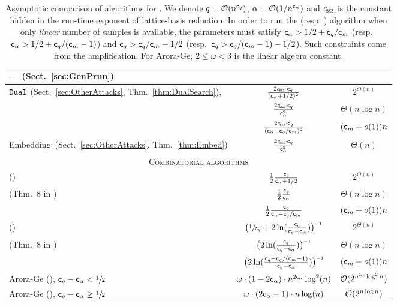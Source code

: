 \begin{table}[h]
\begin{center}
\begin{tabular}{|p{6.3cm} |c | c |}
			-- \GenPrun~(Sect.~\ref{sec:GenPrun}) & & \\ \hline 
			\multirow{3}{*}{$\texttt{Dual}$ (Sect.~\ref{sec:OtherAttacks}, Thm.~\ref{thm:DualSearch}), \cite{DCC:HKM}} & $\frac{2 \cBKZ \cdot \cq}{ (\ca +1/2)^2 } $ &  $2^{\Theta(n)}$  \\[1pt] \cline{2-3}
			& $\frac{2 \cBKZ \cdot \cq}{\vphantom{\scalebox{1.2}x^2} \ca^2}  $  & $\Theta (n \log n)$ \\ \cline{2-3}
			& $\frac{2 \cBKZ \cdot \cq}{\vphantom{\scalebox{1.2}x^2} (\ca-\cq/\cm)^2}  $  & $(\mathsf{c}_m+o(1))n$ \\ \hline
			Embedding~(Sect.~\ref{sec:OtherAttacks}, Thm.~\ref{thm:Embed}) &  $ \frac{2 \cBKZ \cdot \cq}{\vphantom{\scalebox{1.2}x^2} \ca^2} $ & $\Theta(n)$ \\[2pt] \hline
			\multicolumn{3}{|c|}{\textsc{ Combinatorial algorithms}}\\ \hline
			\BKW  (\cite{DCC:ACFFP15}) & $\frac{1}{2} \frac{\mathsf{c}_q}{\mathsf{c}_{\alpha}+1/2} $ & $2^{\Theta(n)}$ \\ \hline
			\multirow{2}{*}{\BKW (Thm.\ 8 in \cite{DCC:HKM})} & $\frac{1}{2} \frac{\mathsf{c}_q}{ \mathsf{c}_{\alpha}} $ & $\Theta(n \log n)$ \\ \cline{2-3}
			& $\frac{1}{2} \frac{\mathsf{c}_q}{ \mathsf{c}_{\alpha}-\mathsf{c}_q/\mathsf{c}_m} $ & $(\mathsf{c}_m+o(1)) n$ \\ \hline	
			\BKWKF (\cite{C:GuoJohSta15, C:KirFou15}) & $ \bigl(\sfrac{1}{\mathsf{c}_q} + 2\ln(\tfrac{\mathsf{c}_q}{\mathsf{c}_q-\mathsf{c}_{\alpha}})\bigr)^{\scriptscriptstyle -1} $ & $2^{\Theta(n)}$ \\ \hline
			\multirow{2}{*}{\BKWKF (Thm.\ 8 in \cite{DCC:HKM})} & $ \bigl(2\ln(\tfrac{\mathsf{c}_q}{\mathsf{c}_q-\mathsf{c}_{\alpha}})\bigr)^{\scriptscriptstyle -1} $ & ${\Theta(n\log n)}$ \\ \cline{2-3}
			& $ \bigl(2\ln(\tfrac{\mathsf{c}_q-\mathsf{c}_q/(\mathsf{c}_m-1)}{\mathsf{c}_q-\mathsf{c}_{\alpha}})\bigr)^{\scriptscriptstyle -1} $ & $(\mathsf{c}_m+o(1)) n$ \\
			 \thickline
			Arora-Ge (\cite{APS15, ICALP:AroGe11}), $\mathsf{c}_q-\mathsf{c}_{\alpha} < \sfrac12$ & \scriptsize{$ \omega \cdot (1-2\mathsf{c}_{\alpha}) \cdot  n^{2 \mathsf{c}_{\alpha}} \log^2(n)$} & $\mathcal{O}(2^{n^{\mathsf{c}_{\alpha}} \log^2 n})$ \\ \hline
			Arora-Ge (\cite{APS15, ICALP:AroGe11}), $\mathsf{c}_q-\mathsf{c}_{\alpha} \geq \sfrac12$ & \scriptsize{$\omega \cdot (2 \mathsf{c}_{\alpha}-1) \cdot n \log(n)$} & $\mathcal{O}(2^{n \log n})$ \\ \hline
		\end{tabular} 
	\end{center}
	\caption[\LWE attacks: asymptotics]{Asymptotic comparison of algorithms for \LWE. We denote $q = \mathcal{O}(n^{\mathsf{c}_q})$, $\alpha =  \mathcal{O}(1/n^{\mathsf{c}_{\alpha}})$ and $\cBKZ$ is the constant hidden in the run-time exponent of lattice-basis reduction. 
	In order to run the \BKW (resp. ) algorithm when only \emph{linear} number of samples is available, the \LWE parameters must satisfy $\mathsf{c}_{\alpha}>1/2+\mathsf{c}_q/\mathsf{c}_m $ (resp.\  $\mathsf{c}_{\alpha}>1/2+\mathsf{c}_q/(\mathsf{c}_m-1)$) and $\mathsf{c}_q>\mathsf{c}_q/\mathsf{c}_m - 1/2$ (resp.\ $\mathsf{c}_q>\mathsf{c}_q/(\mathsf{c}_m-1) - 1/2$).  Such constraints come from the amplification.
	For Arora-Ge, $2\leq \omega <3 $ is the linear algebra constant.}
	\label{table:compareTable}
\end{table}


